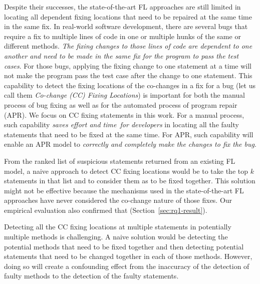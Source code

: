 Despite their successes, the state-of-the-art FL approaches are still
limited in locating all dependent fixing locations that need to be
repaired at the same time in the same fix. In real-world software
development, there are several bugs that require a fix to multiple
lines of code in one or multiple hunks of the same or different
methods. {\em The fixing changes to those lines of code are dependent
  to one another and need to be made in the same fix for the program
  to pass the test cases}. For those bugs, applying the fixing change
to one statement at a time will not make the program pass the test
case after the change to one statement.
%
This capability to detect the fixing locations of the co-changes in a
fix for a bug (let us call them {\em Co-change (CC) Fixing Locations})
is important for both the manual process of bug fixing as well as for
the automated process of program repair (APR). We focus on CC fixing
statements in this work. For a manual process, such capability 
{\em saves effort and time~for developers} in locating all the faulty
statements that need to be fixed at the same time. For APR, such
capability will enable an APR model to {\em correctly and completely
  make the changes to fix the bug}.


From the ranked list of suspicious statements returned from an
existing FL model, a naive approach to detect CC fixing locations would
be to take the top $k$ statements in that list and to consider them as
to be fixed together. This solution might not be effective
because the mechanisms used in the state-of-the-art FL approaches have
never considered the co-change nature of those fixes. Our empirical
evaluation also confirmed that (Section~\ref{sec:rq1-result}).

Detecting all the CC fixing locations at multiple statements in
potentially multiple methods is challenging. A naive solution would be
detecting the potential methods that need to be fixed together and
then detecting potential statements that need to be changed together
in each of those methods. However, doing so will create a confounding
effect from the inaccuracy of the detection of faulty methods to the
detection of the faulty statements.

